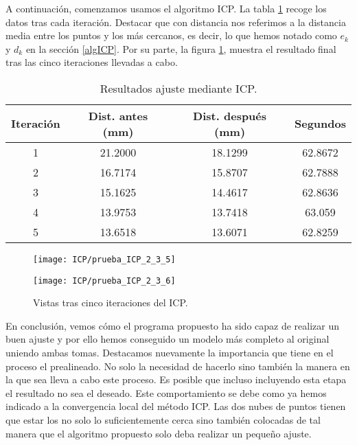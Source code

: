 A continuación, comenzamos usamos el algoritmo ICP. La tabla \ref{table:ICP2} recoge los datos tras cada iteración. Destacar que con distancia nos referimos a la distancia media entre los puntos y los más cercanos, es decir, lo que hemos notado como $ e_k $ y $ d_k $ en la sección \ref{algICP}. Por su parte, la figura \ref{fig:subim2}, muestra el resultado final tras las cinco iteraciones llevadas a cabo. \\

\begin{table}[h!]
	\centering
	\begin{tabular}{| c | c | c | c |} 
		\hline
		Iteración & Dist. antes (mm)  & Dist. después (mm) & Segundos \\
		\hline
		1 & 21.2000 & 18.1299 & 62.8672\\		 
		2 & 16.7174 &  15.8707 &  62.7888\\	
		3 & 15.1625 & 14.4617  & 62.8636\\
		4 & 13.9753 &  13.7418 & 63.059\\
		5 &  13.6518 &  13.6071 & 62.8259\\
		\hline
	\end{tabular}
	\caption{Resultados ajuste mediante ICP.}
	\label{table:ICP2}
\end{table}

\begin{figure}[h!]
	
	\begin{minipage}[b]{0.5\textwidth}
		\centering
		\texttt{[image: ICP/prueba\_ICP\_2\_3\_5]} 
	\end{minipage}
	\begin{minipage}[b]{0.5\textwidth}
		\centering
		\texttt{[image: ICP/prueba\_ICP\_2\_3\_6]}
	\end{minipage}
	\caption{Vistas tras cinco iteraciones del ICP.}
	\label{fig:subim2}
\end{figure}
En conclusión, vemos cómo el programa propuesto ha sido capaz de realizar un buen ajuste y por ello hemos conseguido un modelo más completo al original uniendo ambas tomas. Destacamos nuevamente la importancia que tiene en el proceso el prealineado. No solo la necesidad de hacerlo sino también la manera en la que sea lleva a cabo este proceso. Es posible que incluso incluyendo esta etapa el resultado no sea el deseado. Este comportamiento se debe como  ya hemos indicado a la convergencia local del método ICP. Las dos nubes de puntos tienen que estar los no solo lo suficientemente cerca sino también colocadas de tal manera que el algoritmo propuesto solo deba realizar un pequeño ajuste. \\

